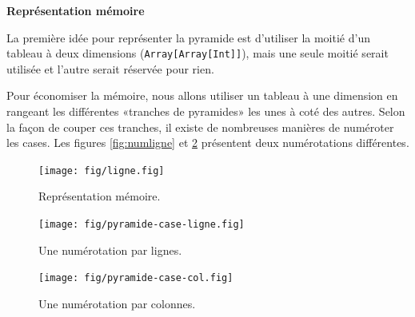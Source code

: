 \documentclass[10pt]{article}\usepackage[correction,nu]{esial}
\begin{document}
\begin{Exercice}\textbf{Représentation mémoire}

  \noindent La première idée pour représenter la pyramide est d'utiliser la
  moitié d'un tableau à deux dimensions (\texttt{Array[Array[Int]]}), mais une
  seule moitié serait utilisée et l'autre serait réservée pour rien.

  Pour économiser la mémoire, nous allons utiliser un tableau à une dimension
  en rangeant les différentes «tranches de pyramides» les unes à coté des
  autres. Selon la façon de couper ces tranches, il existe de nombreuses
  manières de numéroter les cases. Les figures \ref{fig:numligne} et
  \ref{fig:numcol} présentent deux numérotations différentes.
\end{Exercice}

\begin{figure}[h]
  \centering
  \texttt{[image: fig/ligne.fig]}\vspace{-.5\baselineskip}
  \caption{Représentation mémoire.}
  \label{fig:mem}\vspace{-1.5\baselineskip}
\end{figure}

\begin{figure}[h]
  \begin{minipage}{.45\linewidth}
    \centering
    \texttt{[image: fig/pyramide-case-ligne.fig]}\vspace{-.5\baselineskip}
    \caption{Une numérotation par lignes.}
    \label{fig:numligne}
  \end{minipage}\hfill%
  \begin{minipage}{.45\linewidth}
    \centering
    \texttt{[image: fig/pyramide-case-col.fig]}\vspace{-.5\baselineskip}
    \caption{Une numérotation par colonnes.}
    \label{fig:numcol}
  \end{minipage}\vspace{-1\baselineskip}
\end{figure}
\end{document}

